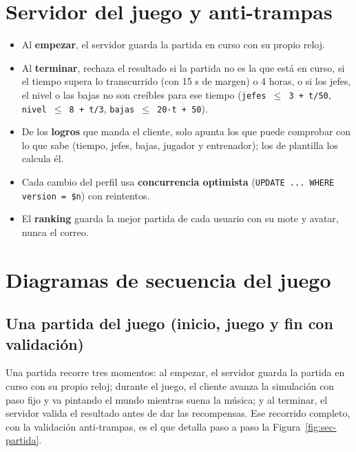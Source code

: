 \section{Servidor del juego y anti-trampas}
\label{sec:juego-servidor}

\begin{itemize}
    \item Al \textbf{empezar}, el servidor guarda la partida en curso con su propio reloj.
    \item Al \textbf{terminar}, rechaza el resultado si la partida no es la que está en curso, si el tiempo supera lo transcurrido (con 15 s de margen) o 4 horas, o si los jefes, el nivel o las bajas no son creíbles para ese tiempo (\texttt{jefes $\leq$ 3 + t/50}, \texttt{nivel $\leq$ 8 + t/3}, \texttt{bajas $\leq$ 20·t + 50}).
    \item De los \textbf{logros} que manda el cliente, solo apunta los que puede comprobar con lo que sabe (tiempo, jefes, bajas, jugador y entrenador); los de plantilla los calcula él.
    \item Cada cambio del perfil usa \textbf{concurrencia optimista} (\texttt{UPDATE ... WHERE version = \$n}) con reintentos.
    \item El \textbf{ranking} guarda la mejor partida de cada usuario con su mote y avatar, nunca el correo.
\end{itemize}

\section{Diagramas de secuencia del juego}
\label{sec:juego-secuencias}

\subsection{Una partida del juego (inicio, juego y fin con validación)}
\label{sec:juego-partida-seq}

Una partida recorre tres momentos: al empezar, el servidor guarda la partida en curso con su propio reloj; durante el juego, el cliente avanza la simulación con paso fijo y va pintando el mundo mientras suena la música; y al terminar, el servidor valida el resultado antes de dar las recompensas. Ese recorrido completo, con la validación anti-trampas, es el que detalla paso a paso la Figura~\ref{fig:sec-partida}.

